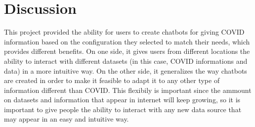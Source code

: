 \documentclass[]{article}
\begin{document}
\section*{Discussion}
This project provided the ability for users to create chatbots for giving COVID information based on the configuration they selected to match their needs, which provides different benefits. On one side, it gives users from different locations the ability to interact with different datasets (in this case, COVID informations and data) in a more intuitive way. On the other side, it generalizes the way chatbots are created in order to make it feasible to adapt it to any other type of information different than COVID. This flexibily is important since the ammount on datasets and information that appear in internet will keep growing, so it is important to give people the ability to interact with any new data source that may appear in an easy and intuitive way.



\end{document}
